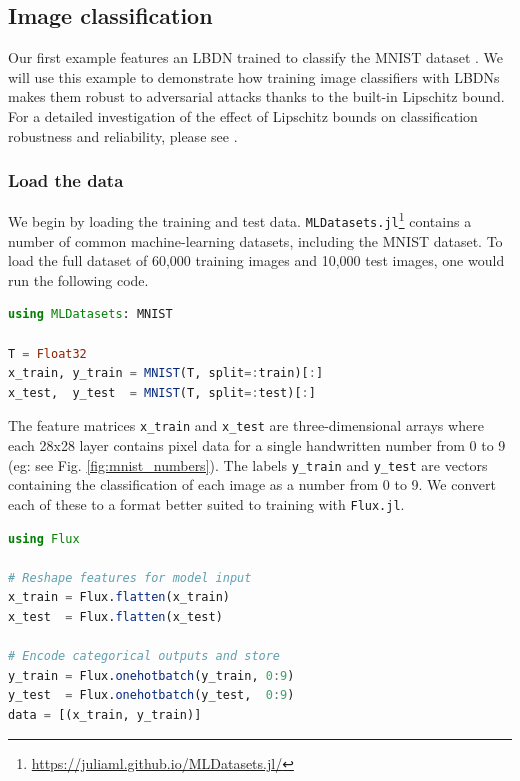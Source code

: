 \subsection{Image classification} \label{sec:mnist}

Our first example features an LBDN trained to classify the MNIST dataset \cite{LeCun++2010}. We will use this example to demonstrate how training image classifiers with LBDNs makes them robust to adversarial attacks thanks to the built-in Lipschitz bound. For a detailed investigation of the effect of Lipschitz bounds on classification robustness and reliability, please see \cite{Wang+Manchester2023}.

\subsubsection{Load the data} \label{sec:mnist-data}

We begin by loading the training and test data. \verb|MLDatasets.jl|\footnote{\url{https://juliaml.github.io/MLDatasets.jl/}} contains a number of common machine-learning datasets, including the MNIST dataset. To load the full dataset of 60,000 training images and 10,000 test images, one would run the following code.

\begin{lstlisting}[language = Julia]
using MLDatasets: MNIST

T = Float32
x_train, y_train = MNIST(T, split=:train)[:]
x_test,  y_test  = MNIST(T, split=:test)[:]
\end{lstlisting}

The feature matrices \verb|x_train| and \verb|x_test| are three-dimensional arrays where each 28x28 layer contains pixel data for a single handwritten number from 0 to 9 (eg: see Fig. \ref{fig:mnist_numbers}). The labels \verb|y_train| and \verb|y_test| are vectors containing the classification of each image as a number from 0 to 9. We convert each of these to a format better suited to training with \verb|Flux.jl|.

\begin{lstlisting}[language = Julia]
using Flux

# Reshape features for model input
x_train = Flux.flatten(x_train)
x_test  = Flux.flatten(x_test)

# Encode categorical outputs and store
y_train = Flux.onehotbatch(y_train, 0:9)
y_test  = Flux.onehotbatch(y_test,  0:9)
data = [(x_train, y_train)]
\end{lstlisting}

